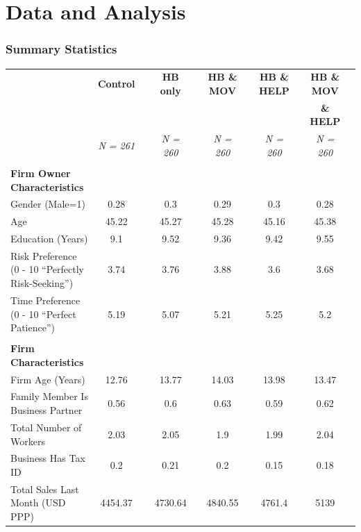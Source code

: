 \documentclass[10pt]{beamer}
\begin{document}
\section{Data and Analysis}


\begin{frame}
\frametitle{Summary Statistics}
{\tiny{
	\begin{table}
		\centering	

			\begin{tabular}{l*{10}{c}}
			\hline\hline
			\hline


&\multicolumn{1}{c}{\textbf{Control}}
&&\multicolumn{1}{c}{\textbf{HB only}}	
&&\multicolumn{1}{c}{\textbf{HB \& MOV}	}
&&\multicolumn{1}{c}{\textbf{HB \& HELP}}	
&&\multicolumn{1}{c}{\textbf{HB \& MOV}}	\\


&\multicolumn{1}{c}{}
&&\multicolumn{1}{c}{}	
&&\multicolumn{1}{c}{}
&&\multicolumn{1}{c}{}	
&&\multicolumn{1}{c}{\textbf{\& HELP}}	\\


&\textit{N = 261}	
&&\textit{N = 260}	
&&\textit{N = 260}	
&&\textit{N = 260}	
&&\textit{N = 260}	\\
\hline \\

\textbf{Firm Owner Characteristics} \\
Gender (Male=1)											& 0.28	&& 0.3	&&0.29	&& 0.3	&& 0.28\\
Age														&45.22	&&45.27	&&45.28	&&45.16	&&45.38 \\
Education (Years)										&9.1	&&9.52	&&9.36	&&9.42	&&9.55 \\
Risk Preference (0 - 10 ``Perfectly Risk-Seeking'')		&3.74	&&3.76	&&3.88	&&3.6	&&3.68 \\											
Time Preference	(0 - 10 ``Perfect Patience'')			&5.19	&&5.07	&&5.21	&&5.25	&&5.2 \\[0.5ex]
\\														
\textbf{Firm Characteristics} \\
Firm Age (Years)										&12.76		&&13.77		&&14.03		&&13.98		&&13.47 \\
Family Member Is Business Partner							&0.56		&&0.6		&&0.63		&&0.59		&&0.62 \\
Total Number of Workers									&2.03		&&2.05		&&1.9		&&1.99		&&2.04 \\
Business Has Tax ID										&0.2		&&0.21		&&0.2		&&0.15		&&0.18 \\
Total Sales Last Month (USD PPP)						&4454.37 &&	4730.64	&& 4840.55	&& 4761.4	&& 5139 \\
												

\end{tabular}
\end{table}}}
\end{frame}
\end{document}
